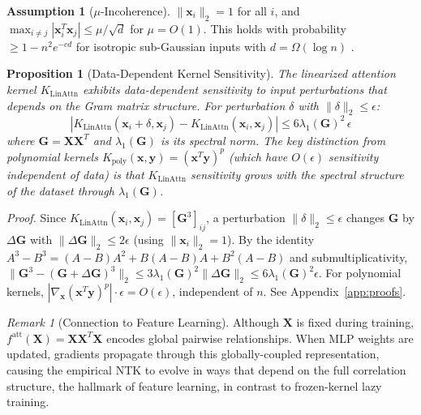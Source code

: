 \documentclass{article}
\theoremstyle{plain}
\newtheorem{proposition}[theorem]{Proposition}
\theoremstyle{definition}
\newtheorem{assumption}[theorem]{Assumption}
\theoremstyle{remark}
\newtheorem{remark}[theorem]{Remark}
\begin{document}
\begin{assumption}[$\mu$-Incoherence]
\label{ass:incoherence}
$\|\mathbf{x}_i\|_2 = 1$ for all $i$, and $\max_{i \neq j} |\mathbf{x}_i^T \mathbf{x}_j| \leq \mu/\sqrt{d}$ for $\mu = O(1)$. This holds with probability $\geq 1 - n^2 e^{-cd}$ for isotropic sub-Gaussian inputs with $d = \Omega(\log n)$ \citep{tropp2012user}.
\end{assumption}

\begin{proposition}[Data-Dependent Kernel Sensitivity]
\label{prop:kernel_sensitivity}
The linearized attention kernel $K_{\text{LinAttn}}$ exhibits \emph{data-dependent} sensitivity to input perturbations that depends on the Gram matrix structure. For perturbation $\delta$ with $\|\delta\|_2 \leq \epsilon$:
\begin{equation}
\left| K_{\text{LinAttn}}(\mathbf{x}_i + \delta, \mathbf{x}_j) - K_{\text{LinAttn}}(\mathbf{x}_i, \mathbf{x}_j) \right| \leq 6\lambda_1(\mathbf{G})^2\,\epsilon
\end{equation}
where $\mathbf{G} = \mathbf{X}\mathbf{X}^T$ and $\lambda_1(\mathbf{G})$ is its spectral norm. The key distinction from polynomial kernels $K_{\text{poly}}(\mathbf{x}, \mathbf{y}) = (\mathbf{x}^T\mathbf{y})^p$ (which have $O(\epsilon)$ sensitivity independent of data) is that $K_{\text{LinAttn}}$ sensitivity grows with the spectral structure of the dataset through $\lambda_1(\mathbf{G})$.
\end{proposition}

\emph{Proof.} Since $K_{\text{LinAttn}}(\mathbf{x}_i,\mathbf{x}_j) = [\mathbf{G}^3]_{ij}$, a perturbation $\|\delta\|_2 \leq \epsilon$ changes $\mathbf{G}$ by $\Delta\mathbf{G}$ with $\|\Delta\mathbf{G}\|_2 \leq 2\epsilon$ (using $\|\mathbf{x}_i\|_2=1$). By the identity $A^3-B^3 = (A-B)A^2+B(A-B)A+B^2(A-B)$ and submultiplicativity, $\|\mathbf{G}^3-(\mathbf{G}+\Delta\mathbf{G})^3\|_2 \leq 3\lambda_1(\mathbf{G})^2\|\Delta\mathbf{G}\|_2 \leq 6\lambda_1(\mathbf{G})^2\epsilon$. For polynomial kernels, $|\nabla_\mathbf{x}(\mathbf{x}^T\mathbf{y})^p|\cdot\epsilon = O(\epsilon)$, independent of $n$. See Appendix~\ref{app:proofs}.

\begin{remark}[Connection to Feature Learning]
\label{rmk:feature_learning}
Although $\mathbf{X}$ is fixed during training, $f^{\text{att}}(\mathbf{X}) = \mathbf{X}\mathbf{X}^T\mathbf{X}$ encodes global pairwise relationships. When MLP weights are updated, gradients propagate through this globally-coupled representation, causing the empirical NTK to evolve in ways that depend on the full correlation structure, the hallmark of feature learning, in contrast to frozen-kernel lazy training.
\end{remark}
\end{document}
